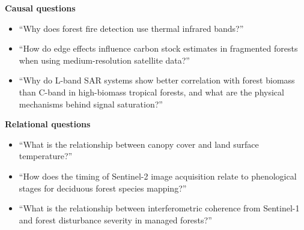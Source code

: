 \noindent\textbf{Causal questions}
\begin{itemize}
\item ``Why does forest fire detection use thermal infrared bands?''
\item ``How do edge effects influence carbon stock estimates in fragmented forests when using medium-resolution satellite data?''
\item ``Why do L-band SAR systems show better correlation with forest biomass than C-band in high-biomass tropical forests, and what are the physical mechanisms behind signal saturation?''
\end{itemize}

\noindent\textbf{Relational questions}
\begin{itemize}
\item ``What is the relationship between canopy cover and land surface temperature?''
\item ``How does the timing of Sentinel-2 image acquisition relate to phenological stages for deciduous forest species mapping?''
\item ``What is the relationship between interferometric coherence from Sentinel-1 and forest disturbance severity in managed forests?''
\end{itemize}

